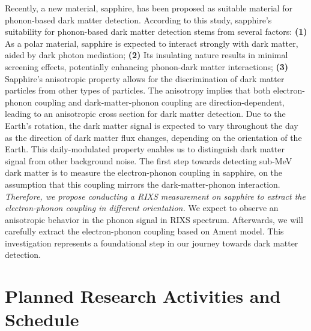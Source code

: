 \documentclass[11pt]{article}
\begin{document}
Recently, a new material, sapphire, has been proposed as suitable material for phonon-based dark matter detection\cite{griffin_directional_2018}. According to this study, sapphire's suitability for phonon-based dark matter detection stems from several factors: 
\textbf{(1)} As a polar material, sapphire is  expected to interact strongly with dark matter, aided by dark photon mediation; 
\textbf{(2)} Its insulating nature results in minimal screening effects, potentially enhancing phonon-dark matter interactions; 
\textbf{(3)} Sapphire's anisotropic property allows for the discrimination of dark matter particles from other types of particles. 
The anisotropy implies that both electron-phonon coupling and dark-matter-phonon coupling are direction-dependent\cite{griffin_directional_2018}, leading to an anisotropic cross section for dark matter detection. 
Due to the Earth's rotation, the dark matter signal is expected to vary throughout the day as the direction of dark matter flux changes, depending on the orientation of the Earth. 
This daily-modulated property enables us to distinguish dark matter signal from other background noise.
The first step towards detecting sub-MeV dark matter is to measure the electron-phonon coupling in sapphire, on the assumption that this coupling mirrors the dark-matter-phonon interaction. 
\textit{Therefore, we propose conducting a RIXS measurement on sapphire to extract the electron-phonon coupling in different orientation.}  
We expect to observe an anisotropic behavior in the phonon signal in RIXS spectrum. 
Afterwards, we will carefully extract the electron-phonon coupling based on Ament model\cite{ament_determining_2011}. 
This investigation represents a foundational step in our journey towards dark matter detection.


\section{Planned Research Activities and Schedule}
\end{document}
